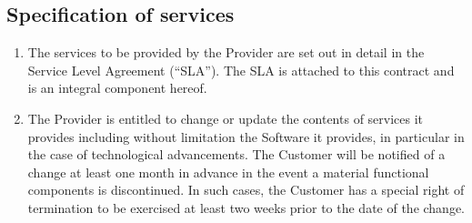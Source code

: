 \documentclass{terms}
\begin{document}
\subsection{Specification of services}
\begin{enumerate}
\item The services to be provided by the Provider are set out in detail in the Service Level Agreement (“SLA”). The SLA is attached to this contract and is an integral component hereof.
\item The Provider is entitled to change or update the contents of services it provides including without limitation the Software it provides, in particular in the case of technological advancements. The Customer will be notified of a change at least one month in advance in the event a material functional components is discontinued. In such cases, the Customer has a special right of termination to be exercised at least two weeks prior to the date of the change.
\end{enumerate}
\end{document}
